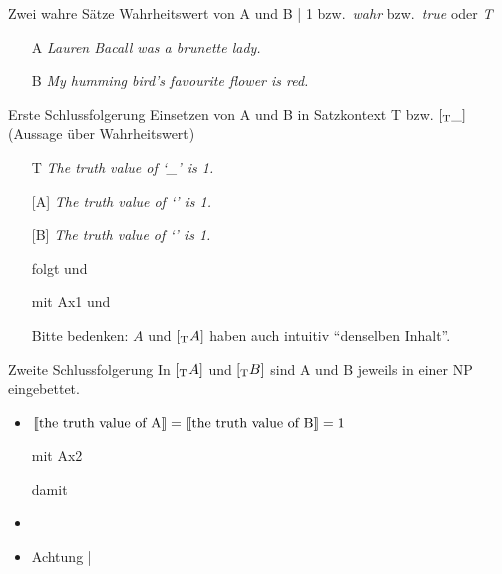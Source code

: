 \begin{frame}
  {Zwei wahre Sätze}
  \onslide<+->
  \onslide<+->
  Wahrheitswert von A und B | \alert{1} bzw.\ \alert{\textit{wahr}} bzw.\ \alert{\textit{true}} oder \alert{\textit{T}}\\
  \Zeile
  \begin{itemize}[<+->]
    \item[A] \textit{Lauren Bacall was a brunette lady.}
    \item[B] \textit{My humming bird's favourite flower is red.} 
  \end{itemize}
\end{frame}

\begin{frame}
  {Erste Schlussfolgerung}
  \onslide<+->
  \onslide<+->
  Einsetzen von A und B in \alert{Satzkontext T bzw. $[_{\text{T}}\_]$} (Aussage über Wahrheitswert)\\
  \Halbzeile
  \begin{itemize}[<+->]
    \item[T] \alert{\textit{The truth value of `\_' is 1.}}
      \Halbzeile
    \item[{[\Sub{T}A]}] \alert{\textit{The truth value of `' is 1.}}
    \item[{[\Sub{T}B]}] \alert{\textit{The truth value of `' is 1.}}
      \Halbzeile
    \item[ ] folgt  und 
    \item[ ] mit Ax1  und 
      \Halbzeile
    \item[ ] Bitte bedenken: $A$ und $[_{\text{T}}A]$ haben auch intuitiv "`denselben Inhalt"'.
  \end{itemize}
\end{frame}

\begin{frame}
  {Zweite Schlussfolgerung}
  \onslide<+->
  \onslide<+->
  In $[_{\text{T}}A]$ und $[_{\text{T}}B]$ sind A und B jeweils in einer NP eingebettet.\\
  \Halbzeile
  \begin{itemize}[<+->]
    \item $\llbracket\text{the truth value of A}\rrbracket=\llbracket\text{the truth value of B}\rrbracket=1$
    \item[ ] mit Ax2 \gruen{$\den{[\Sub{T}A]}=\den{[\Sub{T}B]}$}
    \item[ ] damit 
      \Halbzeile
    \item {}\\
    \item Achtung | 
  \end{itemize}
\end{frame}

